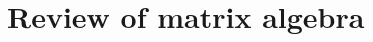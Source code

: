 \documentclass[\main/main.tex]{subfiles}
\begin{document}
\section{Review of matrix algebra}


\end{document}
